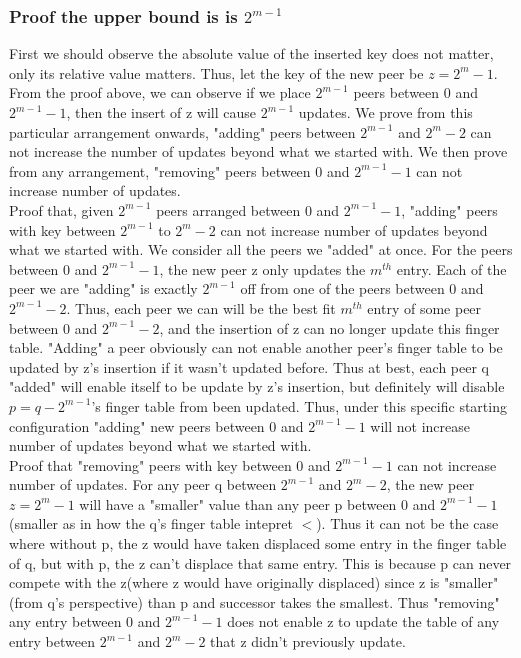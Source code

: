 \documentclass[12pt]{article}
\begin{document}
\begin{enumerate}
\begin{enumerate}
    \subsubsection*{Proof the upper bound is is $2^{m-1}$}
    First we should observe the absolute value of the inserted key does not matter, only its relative value matters.
    Thus, let the key of the new peer be $z=2^m-1$. From the proof above, we can observe
    if we place $2^{m-1}$ peers between 0 and $2^{m-1}-1$, then the insert of z will cause 
    $2^{m-1}$ updates. We prove from this particular arrangement onwards, "adding" peers between $2^{m-1}$ and $2^m-2$
    can not increase the number of updates beyond what we started with. We then prove from any arrangement,
    "removing" peers between 0 and $2^{m-1}-1$ can not increase number of updates.\\

    Proof that, given $2^{m-1}$ peers arranged between 0 and $2^{m-1}-1$, "adding" peers with key between 
    $2^{m-1}$ to $2^m-2$ can not increase number of updates beyond what we started with. We consider all the
    peers we "added" at once. For the peers between 0 and $2^{m-1}-1$, the new peer z only updates the $m^{th}$ entry.
    Each of the peer we are "adding" is exactly $2^{m-1}$ off from one of the peers between 0 and $2^{m-1}-2$. Thus,
    each peer we can will be the best fit $m^{th}$ entry of some peer between 0 and $2^{m-1}-2$, and the insertion of
    z can no longer update this finger table.  "Adding" a peer obviously can not enable another peer's finger table to be 
    updated by z's insertion if it wasn't updated before. Thus at best, each peer q "added" will enable itself to be update by z's
    insertion, but definitely will disable $p=q-2^{m-1}$'s finger table from been updated. Thus, under this specific starting configuration
    "adding" new peers between 0 and $2^{m-1}-1$ will not increase number of updates beyond what we started with. \\

    Proof that "removing" peers with key between 0 and $2^{m-1}-1$ can not increase number of updates. 
    For any peer q between $2^{m-1}$ and $2^{m}-2$, the new peer $z=2^m-1$ will have a "smaller" value than
    any peer p between 0 and $2^{m-1}-1$(smaller as in how the q's finger table intepret $<$). 
    Thus it can not be the case where without p, the z would have taken displaced some entry in the finger
    table of q, but with p, the z can't displace that same entry. This is because p can never compete with
    the z(where z would have originally displaced) since z is "smaller"(from q's perspective) than p and successor
    takes the smallest. Thus "removing" any entry between 0 and $2^{m-1}-1$ does not enable z to update the 
    table of any entry between $2^{m-1}$ and $2^{m}-2$ that z didn't previously update. \\


\end{enumerate}
\end{enumerate}
\end{document}
